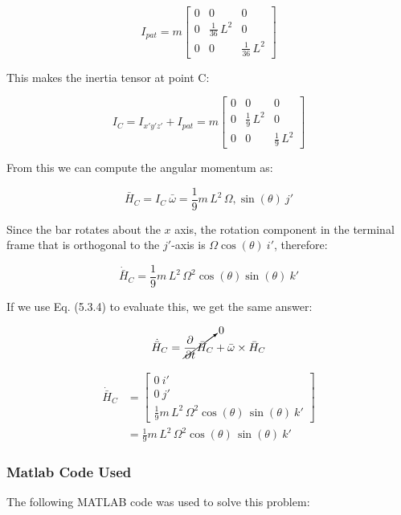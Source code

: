 \documentclass[12pt, letterpaper]{../assignment}
\begin{document}
$$ I_{pat} = 
m\left[\begin{array}{ccc} 0 & 0 & 0\\ 0 & \frac{1}{36}\,L^2 & 0\\ 0 & 0 & \frac{1}{36}\,L^2 \end{array}\right]$$


This makes the inertia tensor at point C:

$$ I_{C} = I_{x'y'z'} + I_{pat} =
m\left[\begin{array}{ccc} 0 & 0 & 0\\ 0 & \frac{1}{9}\,L^2 & 0\\ 0 & 0 & \frac{1}{9}\,L^2 \end{array}\right]$$

From this we can compute the angular momentum as:

\begin{answer}
$$ \bar{H}_C = I_{C}\ \bar{\omega} = \frac{1}{9}m\,L^2\,\Omega ,\sin\left(\theta \right)\ j' $$
\end{answer}

Since the bar rotates about the $x$ axis, the rotation component in the terminal frame that is orthogonal to the $j'$-axis is $\Omega\cos(\theta)\ i'$, therefore:
\begin{answer}
$$ \dot{\bar{H}}_C = \frac{1}{9}m\,L^2\,\Omega^2 \cos\left(\theta \right)\sin\left(\theta \right)\ k' $$
\end{answer}

If we use Eq. (5.3.4) to evaluate this, we get the same answer:

$$ \dot{\bar{H}}_C = \cancelto{0}{\frac{\partial}{\partial t} \bar{H}_C} + \bar{\omega} \times \bar{H}_C $$

\begin{answer}
\begin{equation*}
    \begin{aligned}
\dot{\bar{H}}_C &= \left[\begin{array}{r} 0 \ i'\\ 0\ j'\\ \frac{1}{9}m\,L^2\,\Omega ^2\cos\left(\theta \right)\,\sin\left(\theta \right)\ k' \end{array}\right]\\
&= \frac{1}{9}m\,L^2\,\Omega ^2\cos\left(\theta \right)\,\sin\left(\theta \right)\ k'
\end{aligned}
\end{equation*}
\end{answer}

\subsubsection*{Matlab Code Used}
The following MATLAB code was used to solve this problem:
\end{document}
